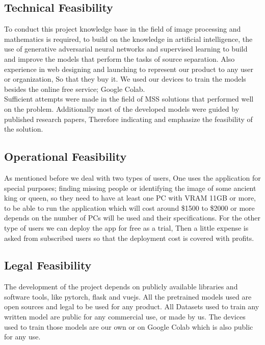 \subsection{ Technical Feasibility}

To conduct this project knowledge base in the field of image processing and mathematics is required, to build on the knowledge in artificial intelligence, the use of generative adversarial neural networks and supervised learning to build and improve the models that perform the tasks of source separation. Also experience in web designing and launching to represent our product to any user or organization, So that they buy it. We used our devices to train the models besides the online free service; Google Colab. \\ 
Sufficient attempts were made in the field of MSS solutions that performed well on the problem. Additionally most of the developed models were guided by published research papers, Therefore indicating and emphasize the feasibility of the solution.

\subsection{ Operational Feasibility }

As mentioned before we deal with two types of users, One uses the application for special purposes; finding missing people or identifying the image of some ancient king or queen, so they need to have at least one PC with VRAM 11GB or more, to be able to run the application which will cost around \$1500 to \$2000 or more depends on the number of PCs will be used and their specifications. For the other type of users we can deploy the app for free as a trial, Then a little expense is asked from subscribed users so that the deployment cost is covered with profits. 

\subsection{ Legal Feasibility }

The development of the project depends on publicly available libraries and software tools, like pytorch, flask and vuejs. All the pretrained models used are open sources and legal to be used for any product. All Datasets used to train any written model are public for any commercial use, or made by us. The devices used to train those models are our own or on Google Colab which is also public for any use.


